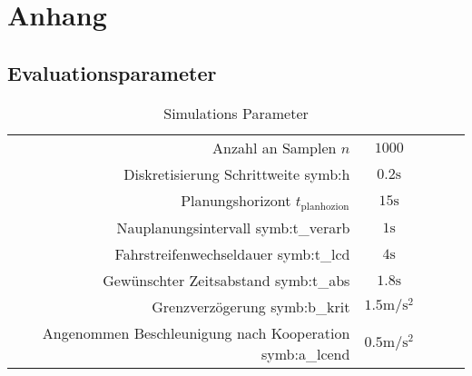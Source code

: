 \chapter{Anhang}
\label{appendix}

\section{Evaluationsparameter}
\label{sec:eval_param}



\begin{table}[!htbp]
    \centering
    \begin{tabular}{crSSSS}
        \hline
        & Anzahl an Samplen \(n\)& \( 1000\)\\
        & {Diskretisierung Schrittweite \gls{symb:h}} & \(0.2 \mathrm{s}\)\\
        & Planungshorizont \(t_\mathrm{planhozion}\)& \(15 \mathrm{s}\)\\
        & Nauplanungsintervall \gls{symb:t_verarb} & \(1\mathrm{s}\) \\
        & Fahrstreifenwechseldauer \gls{symb:t_lcd} & \(4\mathrm{s}\) \\
        & Gew\"unschter Zeitsabstand \gls{symb:t_abs} & \(1.8\mathrm{s}\) \\
        & Grenzverz\"ogerung \gls{symb:b_krit} & \(1.5\mathrm{m/s^2}\) \\   
        & Angenommen Beschleunigung nach Kooperation \gls{symb:a_lcend} & \(0.5\mathrm{m/s^2}\) \\           
         \hline
    \end{tabular}
    \caption[Simulations Parameter]{Simulations Parameter
    }\label{tab:Simpara}
\end{table}


